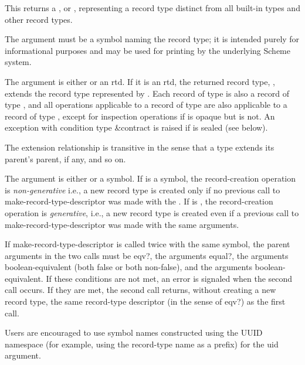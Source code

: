 \begin{entry}{%
}
   
This returns a , or ,
representing a record type distinct from all built-in types and
other record types.

The  argument must be a symbol naming the record type; it is
intended purely for informational purposes and may be used for printing by
the underlying Scheme system.

The  argument is either \schfalse{} or an rtd. If it is an
rtd, the returned record type, , extends the record type
 represented by . Each record of type  is also a
record of type , and all operations applicable to a record of
type  are also applicable to a record of type , except for
inspection operations if  is opaque but  is not. An exception with
condition type {\cf\&contract} is raised if  is sealed (see below).
   
The extension relationship is transitive in the sense that a type extends
its parent's parent, if any, and so on.
   
The  argument is either \schfalse{} or a symbol.
If  is a symbol, the record-creation operation is
\emph{non-generative} i.e., a new record type is created only
if no previous call to {\cf make-record-type-descriptor}
was made with the .
If  is \schfalse{}, the record-creation operation is
\emph{generative}, i.e., a new record type is created even if
a previous call to {\cf make-record-type-descriptor} was
made with the same arguments.

If {\cf make-record-type-descriptor} is
called twice with the same  symbol, the parent
arguments in the two calls must be {\cf eqv?}, the 
arguments {\cf equal?}, the  arguments boolean-equivalent
(both false or both non-false), and the  arguments
boolean-equivalent.
If these conditions are not met, an error is signaled when the
second call occurs.
If they are met, the second call returns, without creating a new
record type, the same record-type descriptor
(in the sense of {\cf eqv?}) as the first call.

\begin{note}   
  Users are encouraged to use symbol names
  constructed using the UUID namespace (for example, using the
  record-type name as a prefix) for the uid argument.
\end{note}


\end{entry}
